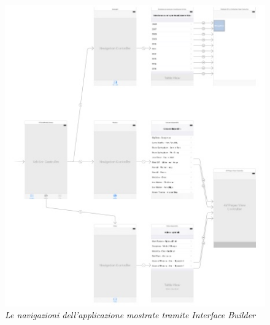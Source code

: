 \begin{figure}[H]
      \centering
      \includegraphics[scale=0.60]{immagini/app_views.jpg}
            \vspace{0.8cm}
            \caption{\textit{Le navigazioni dell'applicazione mostrate tramite \textit{Interface Builder}}}
\end{figure}
\newpage

